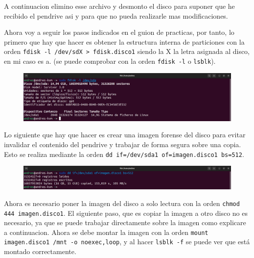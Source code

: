 \documentclass{article}
\begin{document}
A continuacion elimino esse archivo y desmonto el disco para suponer que he recibido el pendrive asi y para que no pueda realizarle mas modificaciones.

Ahora voy a seguir los pasos indicados en el guion de practicas, por tanto, lo primero que hay que hacer es obtener la estructura interna de particiones con la orden \verb|fdisk -l /dev/sdX > fdisk.disco1| siendo la X la letra asignada al disco, en mi caso es a. (se puede comprobar con la orden \verb|fdisk -l| o \verb|lsblk|).

\begin{figure}[H]
    \centering
    \includegraphics[width=\textwidth]{imagenes/Captura desde 2022-12-03 21-28-00.png}
\end{figure}

Lo siguiente que hay que hacer es crear una imagen forense del disco para evitar invalidar el contenido del pendrive y trabajar de forma segura sobre una copia. Esto se realiza mediante la orden \verb|dd if=/dev/sda1 of=imagen.disco1 bs=512|.

\begin{figure}[H]
    \centering
    \includegraphics[width=\textwidth]{imagenes/Captura desde 2022-12-03 21-31-25.png}
\end{figure}

Ahora es necesario poner la imagen del disco a solo lectura con la orden \verb|chmod 444 imagen.disco1|. El siguiente paso, que es copiar la imagen a otro disco no es necesario, ya que se puede trabajar directamente sobre la imagen como explicare a continuacion. Ahora se debe montar la imagen con la orden \verb|mount imagen.disco1 /mnt -o noexec,loop|, y al hacer \verb|lsblk -f| se puede ver que está montado correctamente.
\end{document}

